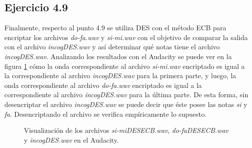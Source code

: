 \documentclass[a4paper,10pt]{article}
\begin{document}
\subsection{Ejercicio 4.9}
Finalmente, respecto al punto 4.9 se utiliza DES con el m\'etodo ECB para encriptar
los archivos \emph{do-fa.wav} y \emph{si-mi.wav} con el objetivo de comparar la salida
con el archivo \emph{incogDES.wav} y as\'i determinar qu\'e notas tiene el archivo
\emph{incogDES.wav}. Analizando los resultados con el Audacity se puede ver en la figura
\ref{fig:DESAudacityCmp} c\'omo la onda correspondiente al archivo \emph{si-mi.wav} encriptado es igual a la correspondiente al archivo \emph{incogDES.wav} para la primera parte, y luego, la onda correspondiente al archivo \emph{do-fa.wav} encriptado es igual a la correspondiente al archivo \emph{incogDES.wav} para la \'ultima parte. De esta forma,
sin desencriptar el archivo \emph{incogDES.wav} se puede decir que \'este posee las notas \emph{si} y \emph{fa}.
Desencriptando el archivo se verifica empíricamente lo supuesto.\\
\begin{figure}
	\begin{center}
	\end{center}
	\caption{Visualización de los archivos \emph{si-miDESECB.wav}, \emph{do-faDESECB.wav} y
		\emph{incogDES.wav} en el Audacity.}
	\label{fig:DESAudacityCmp}
\end{figure}
\end{document}
